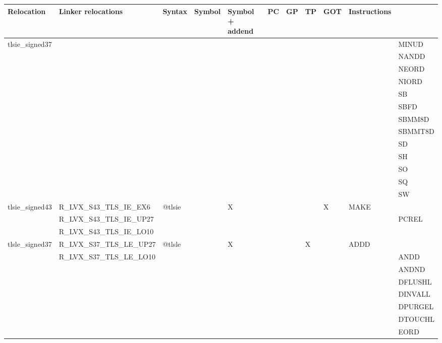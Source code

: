 {\tiny
\begin{tabular}{|l|l|l|l|l|l|l|l|l|l|l|} \hline
\textsf{Relocation} & \textsf{Linker relocations} & \textsf{Syntax} & \textsf{Symbol} & \textsf{Symbol + addend} & \textsf{PC} & \textsf{GP} & \textsf{TP} & \textsf{GOT} & \textsf{Instructions} \\
\hline
\textsf{tlsie\_signed37} & & & & & & & & & & \textsf{MINUD} \\
 & & & & & & & & & & \textsf{NANDD} \\
 & & & & & & & & & & \textsf{NEORD} \\
 & & & & & & & & & & \textsf{NIORD} \\
 & & & & & & & & & & \textsf{SB} \\
 & & & & & & & & & & \textsf{SBFD} \\
 & & & & & & & & & & \textsf{SBMM8D} \\
 & & & & & & & & & & \textsf{SBMMT8D} \\
 & & & & & & & & & & \textsf{SD} \\
 & & & & & & & & & & \textsf{SH} \\
 & & & & & & & & & & \textsf{SO} \\
 & & & & & & & & & & \textsf{SQ} \\
 & & & & & & & & & & \textsf{SW} \\
\hline
\textsf{tlsie\_signed43} & \textsf{R\_LVX\_S43\_TLS\_IE\_EX6} & \textsf{@tlsie} & \textsf{} & \textsf{X} & \textsf{} & \textsf{} & \textsf{} & \textsf{X} & \textsf{MAKE} \\
 & \textsf{R\_LVX\_S43\_TLS\_IE\_UP27} & & & & & & & & & \textsf{PCREL} \\
 & \textsf{R\_LVX\_S43\_TLS\_IE\_LO10} & & & & & & & & & \\
\hline
\textsf{tlsle\_signed37} & \textsf{R\_LVX\_S37\_TLS\_LE\_UP27} & \textsf{@tlsle} & \textsf{} & \textsf{X} & \textsf{} & \textsf{} & \textsf{X} & \textsf{} & \textsf{ADDD} \\
 & \textsf{R\_LVX\_S37\_TLS\_LE\_LO10} & & & & & & & & & \textsf{ANDD} \\
 & & & & & & & & & & \textsf{ANDND} \\
 & & & & & & & & & & \textsf{DFLUSHL} \\
 & & & & & & & & & & \textsf{DINVALL} \\
 & & & & & & & & & & \textsf{DPURGEL} \\
 & & & & & & & & & & \textsf{DTOUCHL} \\
 & & & & & & & & & & \textsf{EORD} \\

\end{tabular}}
